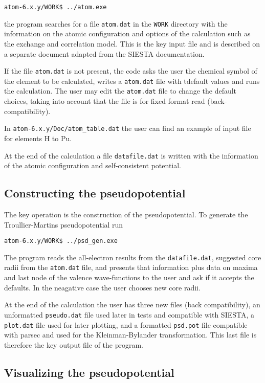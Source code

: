 \documentclass[11pt]{article}
\begin{document}
\noindent\texttt{atom-6.x.y/WORK\$ ../atom.exe}

the program searches for a file \texttt{atom.dat} in the \texttt{WORK} directory with the information on the atomic
configuration and options of the calculation such as the exchange and correlation model.
This is the key input file and is described on a separate document adapted from the SIESTA
documentation.

If the file \texttt{atom.dat} is not present, the code asks the user the chemical symbol of the element to be calculated,
writes a \texttt{atom.dat} file with tdefault values and runs the calculation.
The user may edit the \texttt{atom.dat} file to change the default choices, taking into account that the
file is for fixed format read (back-compatibility).

In \texttt{atom-6.x.y/Doc/atom{\_}table.dat} the user can find an example of input file for elements H to Pu.

At the end of the calculation a file \texttt{datafile.dat} is written with the information of the 
atomic configuration and self-consistent potential.


\subsection{Constructing the pseudopotential}
\label{sec:run-psd}

The key operation is the construction of the pseudopotential.  To generate the Troullier-Martins
pseudopotential run

\noindent\texttt{atom-6.x.y/WORK\$ ../psd{\_}gen.exe}

The program reads the all-electron results from the \texttt{datafile.dat}, suggested core radii from the
\texttt{atom.dat} file, and presents that information plus data on maxima and last node of the
valence wave-functions to the user and ask if it accepts the defaults.  In the neagative case the user
chooses new core radii.

At the end of the calculation the user has three new files (back compatibility), an unformatted
\texttt{pseudo.dat} file used later in tests and compatible with SIESTA,
a \texttt{plot.dat} file used for later plotting, and
a formatted \texttt{psd.pot} file compatible with parsec and used for the Kleinman-Bylander transformation.
This last file is therefore the key output file of the program.


\subsection{Visualizing the pseudopotential}
\label{sec:run-show}
\end{document}
